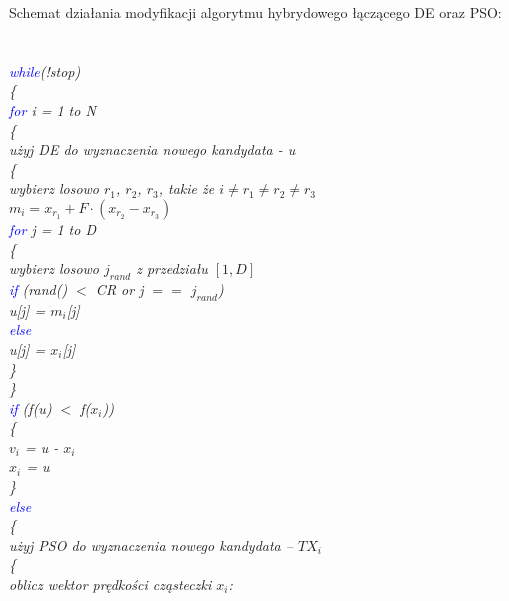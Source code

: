 \documentclass{article}
\begin{document}
\newpage
Schemat działania modyfikacji algorytmu hybrydowego łączącego DE oraz PSO:\\\\
\textit{
\\
\textcolor{blue}{while}(!stop)\\
\{\\
\indent	\textcolor{blue}{for} i = 1 to N\\
\indent	\{\\
\indent\indent użyj DE do wyznaczenia nowego kandydata - u\\
\indent\indent \{\\
\indent\indent		wybierz losowo $r_1$, $r_2$, $r_3$, takie że  $i \neq r_1 \neq r_2 \neq r_3$\\
\indent\indent\indent 		$m_i = x_{r_1} + F \cdot  (x_{r_2} - x_{r_3})$\\
\indent\indent\indent		\textcolor{blue}{for} j = 1 to D\\
\indent\indent\indent		\{\\
\indent\indent\indent\indent			wybierz losowo $j_{rand}$ z przedziału $[1, D]$\\
\indent\indent\indent\indent			\textcolor{blue}{if} (rand() $<$ CR or j $==$ $j_{rand}$)\\
\indent\indent\indent\indent\indent				u[j] = $m_i$[j]\\
\indent\indent\indent\indent			\textcolor{blue}{else}\\
\indent\indent\indent\indent\indent				u[j] = $x_i$[j]\\
\indent\indent\indent		\}\\
\indent\indent \}\\
\indent\indent		\textcolor{blue}{if} (f(u) $<$ f($x_i$))\\
\indent\indent \{\\
\indent\indent\indent			$v_i$ = u - $x_i$\\
\indent\indent\indent			$x_i$ = u\\
\indent\indent \}\\
\indent\indent		\textcolor{blue}{else}\\
\indent\indent		\{\\
\indent\indent\indent			użyj PSO do wyznaczenia nowego kandydata – $TX_i$\\
\indent\indent\indent			\{\\
\indent\indent\indent\indent				oblicz wektor prędkości cząsteczki $x_i$:\\
}
\end{document}
